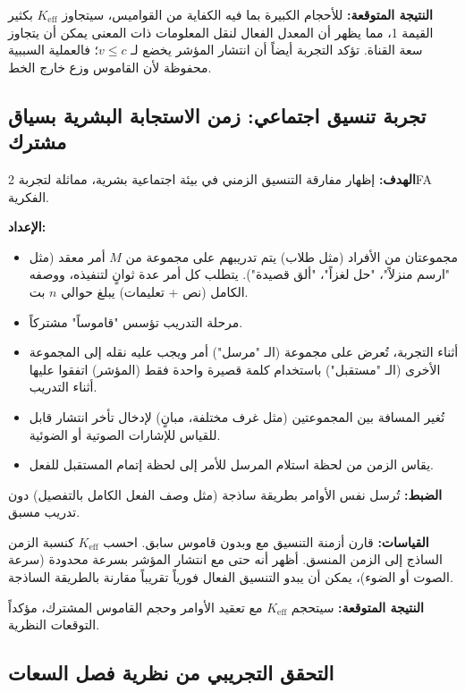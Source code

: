 \documentclass[11pt,a4paper]{article}
\begin{document}
	\textbf{النتيجة المتوقعة:} للأحجام الكبيرة بما فيه الكفاية من القواميس، سيتجاوز \(K_{\mathrm{eff}}\) بكثير القيمة 1، مما يظهر أن المعدل الفعال لنقل المعلومات ذات المعنى يمكن أن يتجاوز سعة القناة. تؤكد التجربة أيضاً أن انتشار المؤشر يخضع لـ \(v \le c\)؛ فالعملية السببية محفوظة لأن القاموس وزع خارج الخط.
	
	\subsection{تجربة تنسيق اجتماعي: زمن الاستجابة البشرية بسياق مشترك}
	\label{subsec:social-experiment}
	
	\textbf{الهدف:} إظهار مفارقة التنسيق الزمني في بيئة اجتماعية بشرية، مماثلة لتجربة 2FA الفكرية.
	
	\textbf{الإعداد:}
	\begin{itemize}
		\item مجموعتان من الأفراد (مثل طلاب) يتم تدريبهم على مجموعة من \(M\) أمر معقد (مثل "ارسم منزلاً"، "حل لغزاً"، "ألق قصيدة"). يتطلب كل أمر عدة ثوانٍ لتنفيذه، ووصفه الكامل (نص + تعليمات) يبلغ حوالي \(n\) بت.
		\item مرحلة التدريب تؤسس "قاموساً" مشتركاً.
		\item أثناء التجربة، تُعرض على مجموعة (الـ "مرسل") أمر ويجب عليه نقله إلى المجموعة الأخرى (الـ "مستقبل") باستخدام كلمة قصيرة واحدة فقط (المؤشر) اتفقوا عليها أثناء التدريب.
		\item تُغير المسافة بين المجموعتين (مثل غرف مختلفة، مبانٍ) لإدخال تأخر انتشار قابل للقياس للإشارات الصوتية أو الضوئية.
		\item يقاس الزمن من لحظة استلام المرسل للأمر إلى لحظة إتمام المستقبل للفعل.
	\end{itemize}
	
	\textbf{الضبط:} تُرسل نفس الأوامر بطريقة ساذجة (مثل وصف الفعل الكامل بالتفصيل) دون تدريب مسبق.
	
	\textbf{القياسات:} قارن أزمنة التنسيق مع وبدون قاموس سابق. احسب \(K_{\mathrm{eff}}\) كنسبة الزمن الساذج إلى الزمن المنسق. أظهر أنه حتى مع انتشار المؤشر بسرعة محدودة (سرعة الصوت أو الضوء)، يمكن أن يبدو التنسيق الفعال فورياً تقريباً مقارنة بالطريقة الساذجة.
	
	\textbf{النتيجة المتوقعة:} سيتحجم \(K_{\mathrm{eff}}\) مع تعقيد الأوامر وحجم القاموس المشترك، مؤكداً التوقعات النظرية.
	
	\subsection{التحقق التجريبي من نظرية فصل السعات}
	\label{subsec:capacity-theorem}
	
\end{document}
